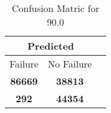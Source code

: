 \begin{table}[] 
\caption{Confusion Matric for 90.0} 
\label{Table: Prediction Accuracy-DMD90.0OnlySunEKF-resetReflectionEKF-top2-Reflection} 
\centering 
\begin{tabular} 
 {@{}ccc@{}} 
\toprule 
\multicolumn{2}{c}{\textbf{Predicted}}
 \\ \midrule 
\multicolumn{1}{|c|}{Failure} & 
\multicolumn{1}{c|}{No Failure}
 \\ \midrule 
\multicolumn{1}{|c|}{\color{green}\textbf{86669}} & 
\multicolumn{1}{c|}{\color{red}\textbf{38813}}
 \\ \midrule 
\multicolumn{1}{|c|}{\color{red}\textbf{292}} & 
\multicolumn{1}{c|}{\color{green}\textbf{44354}}
 \\ \bottomrule 
\end{tabular} 
\end{table} 
